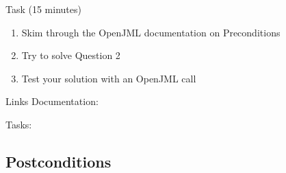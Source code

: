 \begin{frame}{\insertsubsection}
	
	\begin{fancycolumns}
		
		\begin{definition}{Task (15 minutes)}
			
			\begin{enumerate}
				\item Skim through the OpenJML documentation on Preconditions
				\item Try to solve Question 2
				\item Test your solution with an OpenJML call
			\end{enumerate}
		\end{definition}
		
		\nextcolumn
		
		\begin{example}{Links}
			Documentation: 
			\begin{center}
				\centering{}
			\end{center}
			
			
			Tasks: 
			\begin{center}
				\centering{}
			\end{center}
		\end{example}
		
	\end{fancycolumns}
\end{frame}

\subsection{Postconditions}

